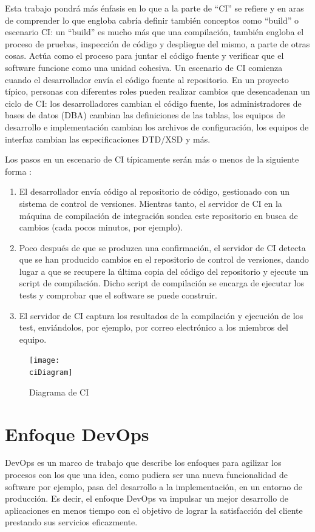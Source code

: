 Esta trabajo pondrá más énfasis en lo que a la parte de ``CI'' se refiere y en aras de comprender lo que engloba cabría definir también conceptos como ``build'' o escenario CI: un ``build'' es mucho más que una compilación, también engloba el proceso de pruebas, inspección de código y despliegue del mismo, a parte de otras cosas. Actúa como el proceso para juntar el código fuente y verificar que el software funcione como una unidad cohesiva. Un escenario de CI comienza cuando el desarrollador envía el código fuente al repositorio. En un proyecto típico, {personas} con diferentes roles pueden realizar cambios que desencadenan un ciclo de CI: los desarrolladores cambian el código fuente, los administradores de bases de datos (DBA) cambian las definiciones de las tablas, los equipos de desarrollo e implementación cambian los archivos de configuración, los equipos de interfaz cambian las especificaciones DTD/XSD y más.

Los pasos en un escenario de CI típicamente serán más o menos de la siguiente forma \cite{CI_Paul_Duvall}:
\begin{enumerate}
    \item El desarrollador envía código al repositorio de código, gestionado con un sistema de control de versiones. 
    Mientras tanto, el servidor de CI en la máquina de compilación de integración sondea este repositorio en busca de cambios (cada pocos minutos, por ejemplo).
    \item Poco después de que se produzca una confirmación, el servidor de CI detecta que se han producido cambios en el repositorio de control de versiones, dando lugar a que se recupere la última copia del código del repositorio y ejecute un script de compilación. Dicho script de compilación se encarga de ejecutar los tests y comprobar que el software se puede construir.
    \item El servidor de CI captura los resultados de la compilación y ejecución de los test, enviándolos, por ejemplo, por correo electrónico a los miembros del equipo.
\end{enumerate}

\begin{figure}[h]
    \centering
    \texttt{[image: \\ciDiagram]}
    \caption{Diagrama de CI}
\end{figure}

\section{Enfoque DevOps}
DevOps es un marco de trabajo que describe los enfoques para agilizar los procesos con los que una idea, como pudiera ser una nueva funcionalidad de software por ejemplo, pasa del desarrollo a la implementación, en un entorno de producción. Es decir, el enfoque DevOps va impulsar un mejor desarrollo de aplicaciones en menos tiempo con el objetivo de lograr la satisfacción del cliente prestando sus servicios eficazmente.

